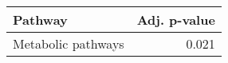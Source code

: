 \begin{tabular}{lr}
\toprule
            Pathway &  Adj. p-value \\
\midrule
 Metabolic pathways &         0.021 \\
\bottomrule
\end{tabular}
